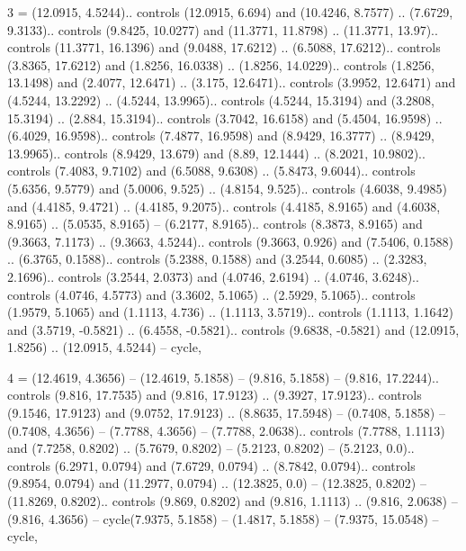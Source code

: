 3 = {(12.0915, 4.5244).. controls (12.0915, 6.694) and (10.4246, 8.7577) .. (7.6729, 9.3133).. controls (9.8425, 10.0277) and (11.3771, 11.8798) .. (11.3771, 13.97).. controls (11.3771, 16.1396) and (9.0488, 17.6212) .. (6.5088, 17.6212).. controls (3.8365, 17.6212) and (1.8256, 16.0338) .. (1.8256, 14.0229).. controls (1.8256, 13.1498) and (2.4077, 12.6471) .. (3.175, 12.6471).. controls (3.9952, 12.6471) and (4.5244, 13.2292) .. (4.5244, 13.9965).. controls (4.5244, 15.3194) and (3.2808, 15.3194) .. (2.884, 15.3194).. controls (3.7042, 16.6158) and (5.4504, 16.9598) .. (6.4029, 16.9598).. controls (7.4877, 16.9598) and (8.9429, 16.3777) .. (8.9429, 13.9965).. controls (8.9429, 13.679) and (8.89, 12.1444) .. (8.2021, 10.9802).. controls (7.4083, 9.7102) and (6.5088, 9.6308) .. (5.8473, 9.6044).. controls (5.6356, 9.5779) and (5.0006, 9.525) .. (4.8154, 9.525).. controls (4.6038, 9.4985) and (4.4185, 9.4721) .. (4.4185, 9.2075).. controls (4.4185, 8.9165) and (4.6038, 8.9165) .. (5.0535, 8.9165) -- (6.2177, 8.9165).. controls (8.3873, 8.9165) and (9.3663, 7.1173) .. (9.3663, 4.5244).. controls (9.3663, 0.926) and (7.5406, 0.1588) .. (6.3765, 0.1588).. controls (5.2388, 0.1588) and (3.2544, 0.6085) .. (2.3283, 2.1696).. controls (3.2544, 2.0373) and (4.0746, 2.6194) .. (4.0746, 3.6248).. controls (4.0746, 4.5773) and (3.3602, 5.1065) .. (2.5929, 5.1065).. controls (1.9579, 5.1065) and (1.1113, 4.736) .. (1.1113, 3.5719).. controls (1.1113, 1.1642) and (3.5719, -0.5821) .. (6.4558, -0.5821).. controls (9.6838, -0.5821) and (12.0915, 1.8256) .. (12.0915, 4.5244) -- cycle},

4 = {(12.4619, 4.3656) -- (12.4619, 5.1858) -- (9.816, 5.1858) -- (9.816, 17.2244).. controls (9.816, 17.7535) and (9.816, 17.9123) .. (9.3927, 17.9123).. controls (9.1546, 17.9123) and (9.0752, 17.9123) .. (8.8635, 17.5948) -- (0.7408, 5.1858) -- (0.7408, 4.3656) -- (7.7788, 4.3656) -- (7.7788, 2.0638).. controls (7.7788, 1.1113) and (7.7258, 0.8202) .. (5.7679, 0.8202) -- (5.2123, 0.8202) -- (5.2123, 0.0).. controls (6.2971, 0.0794) and (7.6729, 0.0794) .. (8.7842, 0.0794).. controls (9.8954, 0.0794) and (11.2977, 0.0794) .. (12.3825, 0.0) -- (12.3825, 0.8202) -- (11.8269, 0.8202).. controls (9.869, 0.8202) and (9.816, 1.1113) .. (9.816, 2.0638) -- (9.816, 4.3656) -- cycle(7.9375, 5.1858) -- (1.4817, 5.1858) -- (7.9375, 15.0548) -- cycle},

